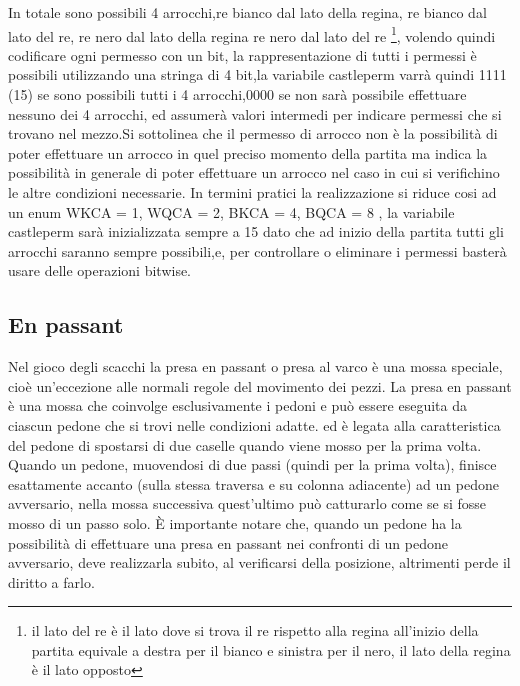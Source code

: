 In totale sono possibili 4 arrocchi,re bianco dal lato della regina, re bianco dal lato del re, re nero dal lato della regina
re  nero dal lato del re \footnote{il lato del re è il lato dove si  trova il re rispetto alla regina all'inizio della partita
    equivale a destra per il bianco e sinistra per il nero, il lato della regina è il lato opposto},
volendo quindi codificare ogni permesso con un bit, la rappresentazione di tutti  i permessi è possibili utilizzando
una stringa di 4 bit,la variabile castleperm varrà quindi 1111 (15) se sono possibili tutti i 4  arrocchi,0000 se non sarà  possibile
effettuare nessuno dei 4 arrocchi, ed assumerà valori intermedi per indicare permessi che si trovano nel mezzo.\newline Si sottolinea che il permesso di arrocco
non è la possibilità di poter effettuare un arrocco in quel preciso momento della partita ma indica la possibilità in generale di poter effettuare un arrocco
nel caso in cui si verifichino le altre condizioni necessarie.\newline
In termini pratici la realizzazione si riduce cosi ad un enum { WKCA = 1, WQCA = 2, BKCA = 4, BQCA = 8 },
la variabile castleperm sarà inizializzata sempre a 15 dato che ad inizio della partita tutti gli arrocchi saranno sempre possibili,e,
per controllare o eliminare i permessi basterà usare delle operazioni bitwise.



\subsection{En passant}
\label{enpassant}
Nel gioco degli scacchi la presa en passant o presa al varco è una mossa speciale, cioè un'eccezione alle normali regole del movimento dei pezzi.
La presa en passant  è una mossa che coinvolge esclusivamente i pedoni e può essere eseguita da ciascun pedone che si trovi nelle condizioni adatte.
ed è legata alla caratteristica del pedone di spostarsi di due caselle quando viene mosso per la prima volta.
Quando un pedone, muovendosi di due passi (quindi per la prima volta), finisce esattamente accanto (sulla stessa traversa e su colonna adiacente) ad un pedone avversario,
nella mossa successiva quest'ultimo può catturarlo come se si fosse mosso di un passo solo.
È importante notare che, quando un pedone ha la possibilità di effettuare una presa en passant nei confronti di un pedone avversario, deve realizzarla subito, al verificarsi della posizione,
altrimenti perde il diritto a farlo.

